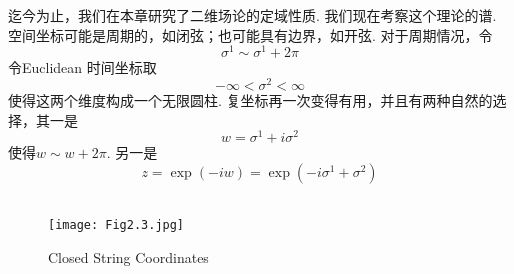 迄今为止，我们在本章研究了二维场论的定域性质. 我们现在考察这个理论的谱. 空间坐标可能是周期的，如闭弦；也可能具有边界，如开弦. 
对于周期情况，令
\begin{equation}
\sigma^{1} \sim \sigma^{1}+2 \pi
\end{equation}
令Euclidean 时间坐标取
\begin{equation}
-\infty<\sigma^{2}<\infty
\end{equation}
使得这两个维度构成一个无限圆柱. 复坐标再一次变得有用，并且有两种自然的选择，其一是
\begin{equation}
w=\sigma^{1}+i \sigma^{2}
\end{equation}
使得$w \sim w+2 \pi$.
另一是
\begin{equation}
z=\exp (-i w)=\exp \left(-i \sigma^{1}+\sigma^{2}\right)
\end{equation}
\\
\begin{figure}
\begin{center}
	\texttt{[image: Fig2.3.jpg]}\\
	\caption{Closed String Coordinates}
\end{center}
\end{figure}

